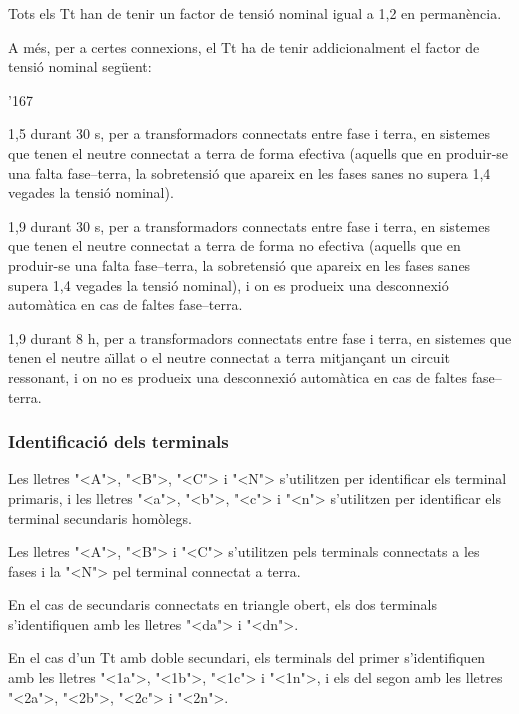 Tots els  Tt han de tenir un factor de tensi\'{o} nominal igual a 1,2 en perman\`{e}ncia.

A m\'{e}s, per a certes connexions, el Tt ha de tenir addicionalment el factor de tensi\'{o}
nominal seg\"{u}ent:
 \begin{dinglist}{'167}
   \item 1,5 durant 30 s,  per a transformadors connectats entre fase i terra, en sistemes que tenen el neutre connectat a terra de forma efectiva (aquells que en produir-se una falta fase--terra, la sobretensi\'{o} que apareix en les fases sanes no supera 1,4 vegades la tensi\'{o} nominal).
   \item 1,9 durant 30 s,  per a transformadors connectats entre fase i terra, en sistemes que tenen el neutre connectat a terra de forma no efectiva (aquells que en produir-se una falta fase--terra, la sobretensi\'{o} que apareix en les fases sanes  supera 1,4 vegades la tensi\'{o} nominal), i on es produeix una desconnexi\'{o} autom\`{a}tica  en cas de faltes fase--terra.
   \item 1,9 durant 8 h,  per a transformadors connectats entre fase i terra, en sistemes que tenen el neutre a\"{\i}llat o el neutre connectat a terra mitjan\c{c}ant un circuit ressonant, i on no es produeix una desconnexi\'{o} autom\`{a}tica  en cas de faltes fase--terra.
\end{dinglist}

\subsubsection{Identificaci\'{o} dels terminals}

 Les lletres {"<}A{">}, {"<}B{">}, {"<}C{">} i {"<}N{">} s'utilitzen per identificar els terminal primaris, i les lletres {"<}a{">}, {"<}b{">}, {"<}c{">} i {"<}n{">} s'utilitzen per identificar els terminal secundaris hom\`{o}legs.

 Les lletres {"<}A{">}, {"<}B{">} i {"<}C{">} s'utilitzen pels terminals connectats a les fases i la {"<}N{">} pel terminal connectat a terra.

 En el cas de secundaris connectats en triangle obert, els dos terminals s'identifiquen amb les lletres {"<}da{">} i {"<}dn{">}.

 En el cas d'un Tt amb doble secundari, els terminals del  primer s'identifiquen amb les lletres  {"<}1a{">}, {"<}1b{">}, {"<}1c{">} i {"<}1n{">}, i els del segon amb les lletres  {"<}2a{">}, {"<}2b{">}, {"<}2c{">} i {"<}2n{">}.

